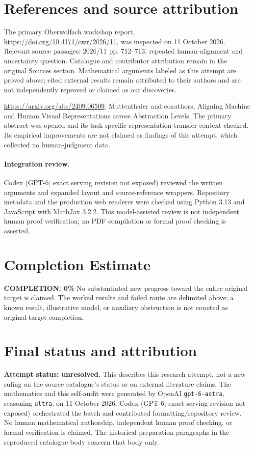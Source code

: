 \documentclass[11pt]{article}
\begin{document}
\section{References and source attribution}
The primary Oberwolfach workshop report, \url{https://doi.org/10.4171/owr/2026/11}, was inspected on 11 October 2026. Relevant source passages: 2026/11 pp. 712--713, repeated human-alignment and uncertainty question. Catalogue and contributor attribution remain in the original Sources section. Mathematical arguments labeled as this attempt are proved above; cited external results remain attributed to their authors and are not independently reproved or claimed as our discoveries.

\url{https://arxiv.org/abs/2409.06509}. Muttenthaler and coauthors, Aligning Machine and Human Visual Representations across Abstraction Levels. The primary abstract was opened and its task-specific representation-transfer context checked. Its empirical improvements are not claimed as findings of this attempt, which collected no human-judgment data.


\paragraph{Integration review.} Codex (GPT-6; exact serving revision not exposed) reviewed the written arguments and expanded layout and source-reference wrappers. Repository metadata and the production web renderer were checked using Python 3.13 and JavaScript with MathJax 3.2.2. This model-assisted review is not independent human proof verification; no PDF compilation or formal proof checking is asserted.

\section{Completion Estimate}
\noindent\textbf{COMPLETION: 0\%}
No substantiated new progress toward the entire original target is claimed. The worked results and failed route are delimited above; a known result, illustrative model, or auxiliary obstruction is not counted as original-target completion.

\section{Final status and attribution}
\textbf{Attempt status: unresolved.} This describes this research attempt, not a new ruling on the source catalogue's status or on external literature claims.
The mathematics and this self-audit were generated by OpenAI \texttt{gpt-6-astra}, reasoning \texttt{ultra}, on 11 October 2026. Codex (GPT-6; exact serving revision not exposed) orchestrated the batch and contributed formatting/repository review. No human mathematical authorship, independent human proof checking, or formal verification is claimed. The historical preparation paragraphs in the reproduced catalogue body concern that body only.
\end{document}
